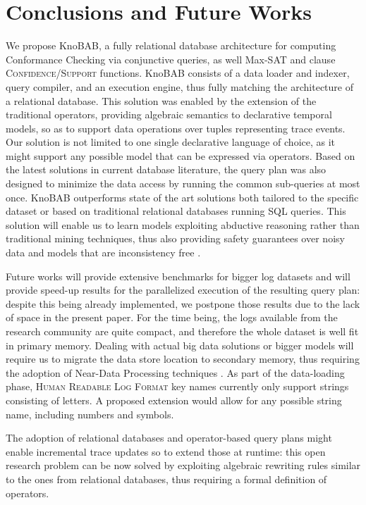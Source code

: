 \section{Conclusions and Future Works}
We propose KnoBAB, a fully relational database architecture for computing Conformance Checking via conjunctive queries, as well Max-SAT and clause \textsc{Confidence}/\textsc{Support} functions.  KnoBAB consists of a data loader and indexer, query compiler, and an execution engine, thus fully matching the architecture of a relational database. This solution was enabled by the extension of the traditional \LTLf operators, providing algebraic semantics to declarative temporal models, so as to support data operations over tuples representing trace  events. Our solution is not limited to one single declarative language of choice, as it might support any possible model that can be expressed via \xLTLf operators. Based on the latest solutions in current database literature, the query plan was also designed to minimize the data access by running the common sub-queries at most once.
%
KnoBAB outperforms state of the art solutions both tailored to the specific dataset or based on traditional relational databases running SQL queries.  This solution will enable us to learn models exploiting abductive reasoning rather than traditional mining techniques, thus also providing safety guarantees over noisy data and models that are inconsistency free \cite{PicadoDTL20}. 

Future works will provide extensive benchmarks for bigger log datasets and will provide speed-up results for the parallelized execution of the resulting query plan: despite this being already implemented, we postpone those results due to the lack of space in the present paper. For the time being, the logs available from the research community are quite compact, and therefore the whole dataset is well fit in primary memory. Dealing with actual big data solutions or bigger models will require us to migrate the data store location to secondary memory, thus requiring the adoption of Near-Data Processing techniques \cite{GuYBJLYKKYCJC16}. {As part of the data-loading phase, \textsc{Human Readable Log Format} key names currently only support strings consisting of letters. A proposed extension would allow for any possible string name, including numbers and symbols. } 

The adoption of relational databases and operator-based query plans might enable incremental trace updates so to extend those at runtime: this open research problem  can be now  solved by exploiting algebraic rewriting rules similar to the ones from relational databases, thus requiring a formal definition of \xLTLf operators. 

